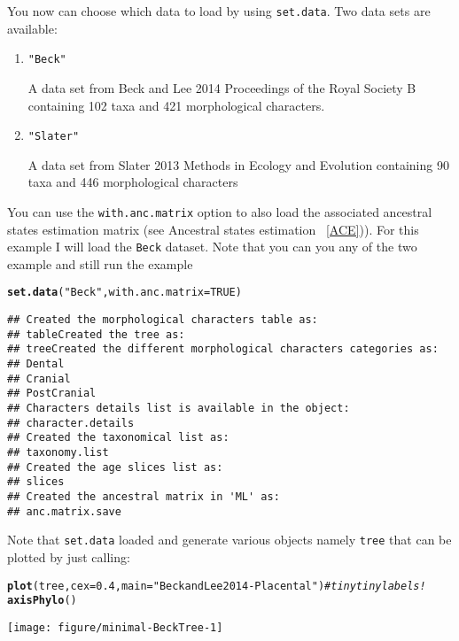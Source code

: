 \documentclass[a4paper,11pt]{article}\usepackage[]{graphicx}\usepackage[]{color}
\makeatletter
\def\maxwidth{ %
  \ifdim\Gin@nat@width>\linewidth
    \linewidth
  \else
    \Gin@nat@width
  \fi
}
\newcommand{\hlnum}[1]{\textcolor[rgb]{0.686,0.059,0.569}{#1}}%
\newcommand{\hlstr}[1]{\textcolor[rgb]{0.192,0.494,0.8}{#1}}%
\newcommand{\hlcom}[1]{\textcolor[rgb]{0.678,0.584,0.686}{\textit{#1}}}%
\newcommand{\hlstd}[1]{\textcolor[rgb]{0.345,0.345,0.345}{#1}}%
\newcommand{\hlkwc}[1]{\textcolor[rgb]{0.333,0.667,0.333}{#1}}%
\newcommand{\hlkwd}[1]{\textcolor[rgb]{0.737,0.353,0.396}{\textbf{#1}}}%
\newenvironment{kframe}{%
 \def\at@end@of@kframe{}%
 \ifinner\ifhmode%
  \def\at@end@of@kframe{\end{minipage}}%
  \begin{minipage}{\columnwidth}%
 \fi\fi%
 \def\FrameCommand##1{\hskip\@totalleftmargin \hskip-\fboxsep
 \colorbox{shadecolor}{##1}\hskip-\fboxsep
     \hskip-\linewidth \hskip-\@totalleftmargin \hskip\columnwidth}%
 \MakeFramed {\advance\hsize-\width
   \@totalleftmargin\z@ \linewidth\hsize
   \@setminipage}}%
 {\par\unskip\endMakeFramed%
 \at@end@of@kframe}
\newenvironment{knitrout}{}{} %
\makeatother
\begin{document}
You now can choose which data to load by using \texttt{set.data}. Two data sets are available:
\begin{enumerate}
\item{\texttt{"Beck"}}

A data set from Beck and Lee 2014 Proceedings of the Royal Society B containing 102 taxa and 421 morphological characters.

\item{\texttt{"Slater"}}

A data set from Slater 2013 Methods in Ecology and Evolution containing 90 taxa and 446 morphological characters
\end{enumerate}
You can use the \texttt{with.anc.matrix} option to also load the associated ancestral states estimation matrix (see Ancestral states estimation ~\ref{ACE})).
For this example I will load the \texttt{Beck} dataset. Note that you can you any of the two example and still run the example

\begin{knitrout}
\color{fgcolor}\begin{kframe}
\begin{alltt}
\hlkwd{set.data}\hlstd{(}\hlstr{"Beck"}\hlstd{,} \hlkwc{with.anc.matrix}\hlstd{=}\hlnum{TRUE}\hlstd{)}
\end{alltt}
\begin{verbatim}
## Created the morphological characters table as:
## tableCreated the tree as:
## treeCreated the different morphological characters categories as:
## Dental
## Cranial
## PostCranial
## Characters details list is available in the object:
## character.details
## Created the taxonomical list as:
## taxonomy.list
## Created the age slices list as:
## slices
## Created the ancestral matrix in 'ML' as:
## anc.matrix.save
\end{verbatim}
\end{kframe}
\end{knitrout}

Note that \texttt{set.data} loaded and generate various objects namely \texttt{tree} that can be plotted by just calling:

\begin{knitrout}
\color{fgcolor}\begin{kframe}
\begin{alltt}
\hlkwd{plot}\hlstd{(tree,} \hlkwc{cex}\hlstd{=}\hlnum{0.4}\hlstd{,} \hlkwc{main}\hlstd{=}\hlstr{"Beck and Lee 2014 - Placental"}\hlstd{)}\hlcom{#tiny tiny labels!}
\hlkwd{axisPhylo}\hlstd{()}
\end{alltt}
\end{kframe}

{\centering \texttt{[image: figure/minimal-BeckTree-1]} 

}



\end{knitrout}
\end{document}
